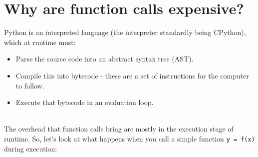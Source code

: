 \documentclass[../main.tex]{subfiles}
\begin{document}
    \section{Why are function calls expensive?}\label{sec:why-are-function-calls-expensive}

    Python is an interpreted language (the interpreter standardly being CPython), which at runtime must:
    \begin{itemize}
        \item Parse the source code into an abstract syntax tree (AST).
        \item Compile this into bytecode - these are a set of instructions for the computer to follow.
        \item Execute that bytecode in an evaluation loop.
    \end{itemize}\\
    The overhead that function calls bring are mostly in the execution stage of runtime.
    So, let's look at what happens when you call a simple function \verb|y = f(x)| during execution:
\end{document}
